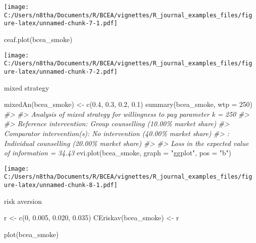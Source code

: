 \documentclass[
]{article}
\newenvironment{Shaded}{\begin{snugshade}}{\end{snugshade}}
\newcommand{\AttributeTok}[1]{\textcolor[rgb]{0.77,0.63,0.00}{#1}}
\newcommand{\CommentTok}[1]{\textcolor[rgb]{0.56,0.35,0.01}{\textit{#1}}}
\newcommand{\DecValTok}[1]{\textcolor[rgb]{0.00,0.00,0.81}{#1}}
\newcommand{\FloatTok}[1]{\textcolor[rgb]{0.00,0.00,0.81}{#1}}
\newcommand{\FunctionTok}[1]{\textcolor[rgb]{0.00,0.00,0.00}{#1}}
\newcommand{\NormalTok}[1]{#1}
\newcommand{\OtherTok}[1]{\textcolor[rgb]{0.56,0.35,0.01}{#1}}
\newcommand{\StringTok}[1]{\textcolor[rgb]{0.31,0.60,0.02}{#1}}
\begin{document}
\texttt{[image: C:/Users/n8tha/Documents/R/BCEA/vignettes/R\_journal\_examples\_files/figure-latex/unnamed-chunk-7-1.pdf]}

\begin{Shaded}
\begin{Highlighting}[]
\FunctionTok{ceaf.plot}\NormalTok{(bcea\_smoke)}
\end{Highlighting}
\end{Shaded}

\texttt{[image: C:/Users/n8tha/Documents/R/BCEA/vignettes/R\_journal\_examples\_files/figure-latex/unnamed-chunk-7-2.pdf]}

mixed strategy

\begin{Shaded}
\begin{Highlighting}[]
\FunctionTok{mixedAn}\NormalTok{(bcea\_smoke) }\OtherTok{\textless{}{-}} \FunctionTok{c}\NormalTok{(}\FloatTok{0.4}\NormalTok{, }\FloatTok{0.3}\NormalTok{, }\FloatTok{0.2}\NormalTok{, }\FloatTok{0.1}\NormalTok{)}
\FunctionTok{summary}\NormalTok{(bcea\_smoke, }\AttributeTok{wtp =} \DecValTok{250}\NormalTok{)}
\CommentTok{\#\textgreater{} }
\CommentTok{\#\textgreater{} Analysis of mixed strategy for willingness to pay parameter k = 250}
\CommentTok{\#\textgreater{} }
\CommentTok{\#\textgreater{} Reference intervention: Group counselling (10.00\% market share)}
\CommentTok{\#\textgreater{} Comparator intervention(s): No intervention (40.00\% market share)}
\CommentTok{\#\textgreater{}                           : Individual counselling (20.00\% market share)}
\CommentTok{\#\textgreater{} }
\CommentTok{\#\textgreater{} Loss in the expected value of information = 34.43}
\FunctionTok{evi.plot}\NormalTok{(bcea\_smoke, }\AttributeTok{graph =} \StringTok{"ggplot"}\NormalTok{, }\AttributeTok{pos =} \StringTok{"b"}\NormalTok{)}
\end{Highlighting}
\end{Shaded}

\texttt{[image: C:/Users/n8tha/Documents/R/BCEA/vignettes/R\_journal\_examples\_files/figure-latex/unnamed-chunk-8-1.pdf]}

risk aversion

\begin{Shaded}
\begin{Highlighting}[]
\NormalTok{r }\OtherTok{\textless{}{-}} \FunctionTok{c}\NormalTok{(}\DecValTok{0}\NormalTok{, }\FloatTok{0.005}\NormalTok{, }\FloatTok{0.020}\NormalTok{, }\FloatTok{0.035}\NormalTok{)}
\FunctionTok{CEriskav}\NormalTok{(bcea\_smoke) }\OtherTok{\textless{}{-}}\NormalTok{ r}

\FunctionTok{plot}\NormalTok{(bcea\_smoke)}
\end{Highlighting}
\end{Shaded}
\end{document}
